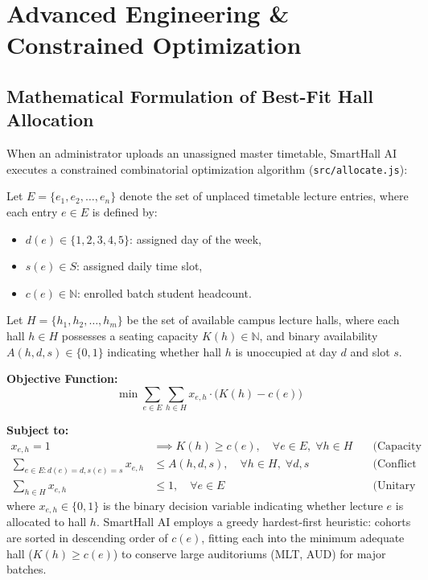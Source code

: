 \documentclass[11pt,a4paper]{article}
\begin{document}
\section{Advanced Engineering \& Constrained Optimization}

\subsection{Mathematical Formulation of Best-Fit Hall Allocation}
When an administrator uploads an unassigned master timetable, SmartHall AI executes a constrained combinatorial optimization algorithm (\texttt{src/allocate.js}):

Let $E = \{e_1, e_2, \dots, e_n\}$ denote the set of unplaced timetable lecture entries, where each entry $e \in E$ is defined by:
\begin{itemize}
    \item $d(e) \in \{1, 2, 3, 4, 5\}$: assigned day of the week,
    \item $s(e) \in S$: assigned daily time slot,
    \item $c(e) \in \mathbb{N}$: enrolled batch student headcount.
\end{itemize}

Let $H = \{h_1, h_2, \dots, h_m\}$ be the set of available campus lecture halls, where each hall $h \in H$ possesses a seating capacity $K(h) \in \mathbb{N}$, and binary availability $A(h, d, s) \in \{0, 1\}$ indicating whether hall $h$ is unoccupied at day $d$ and slot $s$.

\noindent \textbf{Objective Function:}
\begin{equation}
    \min \sum_{e \in E} \sum_{h \in H} x_{e, h} \cdot \Big( K(h) - c(e) \Big)
\end{equation}

\noindent \textbf{Subject to:}
\begin{align}
    x_{e, h} = 1 &\implies K(h) \ge c(e), \quad \forall e \in E, \; \forall h \in H \quad &\text{(Capacity Feasibility)} \\
    \sum_{e \in E : d(e)=d, s(e)=s} x_{e, h} &\le A(h, d, s), \quad \forall h \in H, \; \forall d, s \quad &\text{(Conflict Exclusion)} \\
    \sum_{h \in H} x_{e, h} &\le 1, \quad \forall e \in E \quad &\text{(Unitary Assignment)}
\end{align}
where $x_{e, h} \in \{0, 1\}$ is the binary decision variable indicating whether lecture $e$ is allocated to hall $h$. SmartHall AI employs a greedy hardest-first heuristic: cohorts are sorted in descending order of $c(e)$, fitting each into the minimum adequate hall ($K(h) \ge c(e)$) to conserve large auditoriums (MLT, AUD) for major batches.
\end{document}
